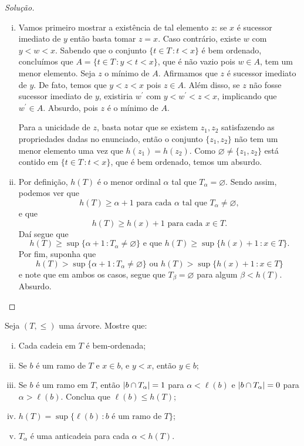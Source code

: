 \documentclass[a4paper]{article}
\begin{document}
\begin{proof}[Solução]
\begin{enumerate}[(i)]
  \item 
Vamos primeiro mostrar a existência de tal elemento \(z\): se \(x\) é sucessor
imediato de \(y\) então basta tomar \(z=x\). Caso contrário,
existe \(w\) com \(y < w < x\). Sabendo que o conjunto \(\{t \in T\,\colon t
<x\}\) é bem ordenado, concluímos que \(A = \{ t \in T
\,\colon y < t < x\}\), que é não vazio pois \(w\in A\), tem um menor elemento. Seja
\(z\) o mínimo de \(A\). Afirmamos que \(z\) é sucessor imediato de \(y\).
De fato, temos que \(y < z < x\) pois \(z \in A\). Além disso, se \(z\) não
fosse sucessor imediato de \(y\), existiria \(w^\prime\) com
\(y< w^\prime<z<x\), implicando que \(w^\prime\in A\). Absurdo, pois \(z\) é o mínimo de \(A\).


Para a unicidade de \(z\), basta notar que se existem \(z_1,z_2\) satisfazendo
as propriedades dadas no enunciado, então o conjunto
\(\{z_1,z_2\}\) não tem um menor elemento uma vez que \(h(z_1)=h(z_2)\). Como
\(\varnothing\not=\{z_1,z_2\}\) está contido em \(\{t \in T\,\colon t
<x\}\), que é bem ordenado, temos um absurdo.

  \item  Por definição, \(h(T)\) é o menor ordinal
    \(\alpha\) tal que \(T_\alpha=\varnothing\). Sendo assim, podemos ver que
    \[h(T)\geq \alpha +1 \text{ para cada } \alpha \text{ tal que }
      T_\alpha\not=\varnothing,\]
    e que
    \[h(T)\geq h(x)+1\text{ para cada } x\in T.\]
    Daí segue que
    \[h(T)\geq \sup\{\alpha+1\,\colon T_\alpha\not=\varnothing\}\text{ e que }
      h(T)\geq\sup\{h(x)+1\,\colon x\in T\}.\]
    Por fim, suponha que
    \[h(T)> \sup\{\alpha+1\,\colon T_\alpha\not=\varnothing\}\text{ ou } h(T)
      >\sup\{h(x)+1\,\colon x\in T\}\]
    e note que em ambos os casos, segue que \(T_\beta=\varnothing\) para algum \(\beta<
    h(T)\). Absurdo.\qedhere
\end{enumerate}
\end{proof}
\begin{exercicio}
    Seja \((T,\leq)\) uma árvore. Mostre que:
    \begin{enumerate}[(i)]
    \item Cada cadeia em \(T\) é bem-ordenada;
    \item Se \(b\) é um ramo de \(T\) e \(x\in b\), e \(y<x\), então \(y\in b\);
    \item Se \(b\) é um ramo em \(T\), então \(\vert b\cap T_\alpha \vert=1\) para
      \(\alpha <\ell (b)\) e \(\vert b\cap T_\alpha \vert=0\) para \(\alpha
      >\ell (b)\). Conclua que \(\ell (b)\leq h(T)\);
    \item \(h(T)=\sup\{\ell (b)\,\colon b \text{ é um ramo de } T\}\);
    \item \(T_\alpha\) é uma anticadeia para cada \(\alpha < h(T)\).
     \end{enumerate}
  \end{exercicio}
\end{document}
